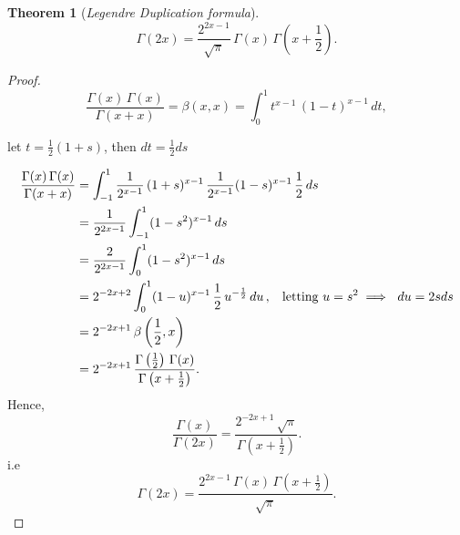 \documentclass[12pt,a4paper]{report}
\theoremstyle{definition}
\newtheorem{thm}{Theorem}[section]
\theoremstyle{plain}
\begin{document}
\begin{thm}[\textit{Legendre Duplication formula}]
$$\Gamma(2x) = \frac{2^{2x - 1}}{\sqrt{\pi}}\, \Gamma(x)\, \Gamma\left(x + \frac{1}{2}\right).$$
\end{thm}
\begin{proof}
$$\frac{\Gamma(x)\, \Gamma(x)}{\Gamma(x + x)} = \beta(x,x) = \int_0^1t^{x-1}\, (1 - t)^{x - 1}\, dt,$$

let $t = \frac{1}{2}(1 + s)$, then $dt = \frac{1}{2}ds$

\begin{align*}
\frac{\Gamma(x)\, \Gamma(x)}{\Gamma(x + x)} & = \int_{-1}^1 \frac{1}{2^{x-1}}\, (1 + s)^{x - 1}\, \frac{1}{2^{x - 1}}(1 - s)^{x - 1}\, \frac{1}{2}\, ds\\
& = \frac{1}{2^{2x - 1}}\int_{-1}^1 (1 - s^2 )^{x-1}\, ds\\
& = \frac{2}{2^{2x - 1}}\int_0^1(1 - s^2)^{x-1}\, ds\\
& = 2^{-2x +2}\int_0^1(1 - u)^{x-1}\, \frac{1}{2}\, u^{-\frac{1}{2}}\, du\, , \hspace{0.3cm} \text{letting}\, \, u = s^2  \implies \,\, du = 2sds\\
& = 2^{-2x+1}\, \beta\left(\frac{1}{2}, x\right)\\
& = 2^{-2x + 1}\, \frac{\Gamma\left(\frac{1}{2}\right) \, \Gamma(x)}{\Gamma\left(x + \frac{1}{2}\right)}.
\end{align*}
Hence,
$$\frac{\Gamma(x)}{\Gamma(2x)} = \frac{2^{-2x + 1}\, \sqrt{\pi}}{\Gamma\left(x + \frac{1}{2}\right)}.$$
i.e
$$\Gamma(2x) = \frac{2^{2x - 1} \, \Gamma(x)\, \Gamma\left(x + \frac{1}{2}\right)}{\sqrt{\pi}}.$$
\end{proof}
\end{document}
